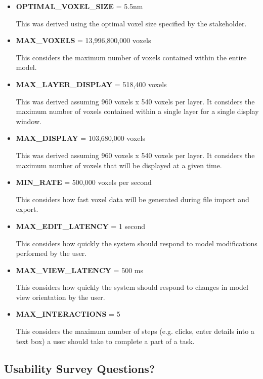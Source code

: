 \documentclass[12pt, titlepage]{article}
\begin{document}
\begin{itemize}
  \item \textbf{OPTIMAL\_VOXEL\_SIZE} = 5.5nm
  
  This was derived using the optimal voxel size specified by the stakeholder.
  
  \item \textbf{MAX\_VOXELS} = 13,996,800,000 voxels
  
  This considers the maximum number of voxels contained within the entire model.
  
  \item \textbf{MAX\_LAYER\_DISPLAY} = 518,400 voxels
  
  This was derived assuming 960 voxels x 540 voxels per layer. It considers the maximum number of voxels contained within a single layer for a single display window.
  
  \item \textbf{MAX\_DISPLAY} = 103,680,000 voxels
  
  This was derived assuming 960 voxels x 540 voxels per layer. It considers the maximum number of voxels that will be displayed at a given time.
  
  \item \textbf{MIN\_RATE} = 500,000 voxels per second
  
  This considers how fast voxel data will be generated during file import and export.
  
  \item \textbf{MAX\_EDIT\_LATENCY} = 1 second
  
  This considers how quickly the system should respond to model modifications performed by the user.
  
  \item \textbf{MAX\_VIEW\_LATENCY} = 500 ms
  
  This considers how quickly the system should respond to changes in model view orientation by the user.
  
  \item \textbf{MAX\_INTERACTIONS} = 5
  
  This considers the maximum number of steps (e.g. clicks, enter details into a text box) a user should take to complete a part of a task.
\end{itemize}

\subsection{Usability Survey Questions?}
\end{document}
